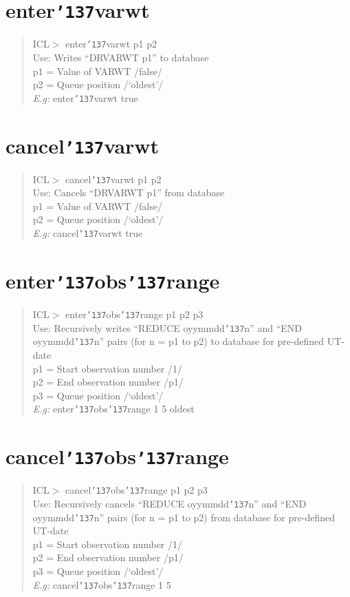 \documentclass[a4paper]{book}
\renewcommand{\_}{{\tt\char'137}}
\begin{document}
\section{enter\_varwt}
\begin{quote}
ICL$>$ enter\_varwt p1 p2 \\
Use: Writes ``DRVARWT p1'' to database \\
p1 = Value of VARWT /false/ \\
p2 = Queue position /`oldest'/ \\
{\em E.g:} enter\_varwt true
\end{quote}
\section{cancel\_varwt}
\begin{quote}
ICL$>$ cancel\_varwt p1 p2 \\
Use: Cancels ``DRVARWT p1'' from database \\
p1 = Value of VARWT /false/ \\
p2 = Queue position /`oldest'/ \\
{\em E.g:} cancel\_varwt true
\end{quote}
\section{enter\_obs\_range}
\begin{quote}
ICL$>$ enter\_obs\_range p1 p2 p3 \\
Use: Recursively writes ``REDUCE oyymmdd\_n'' and
``END oyymmdd\_n'' pairs
(for n = p1 to p2) to database for pre-defined UT-date \\
p1 = Start observation number /1/ \\
p2 = End observation number /p1/ \\
p3 = Queue position /`oldest'/ \\
{\em E.g:} enter\_obs\_range 1 5 oldest
\end{quote}
\section{cancel\_obs\_range}
\begin{quote}
ICL$>$ cancel\_obs\_range p1 p2 p3 \\
Use: Recursively cancels ``REDUCE oyymmdd\_n'' and
``END oyymmdd\_n'' pairs
(for n = p1 to p2) from database for pre-defined UT-date \\
p1 = Start observation number /1/ \\
p2 = End observation number /p1/ \\
p3 = Queue position /`oldest'/ \\
{\em E.g:} cancel\_obs\_range 1 5
\end{quote}
\end{document}
